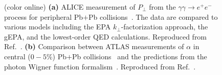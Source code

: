 \documentclass[12pt,epjc3]{svjour3}\sloppy
\begin{document}
\begin{figure}
    \caption{ (color online) \textbf{(a)} ALICE measurement of $P_\perp$ from the $\gamma\gamma \rightarrow e^+e^-$ process for peripheral Pb$+$Pb collisions~\cite{lehnerDielectronProductionLow2019a}. The data are compared to various models including the EPA $k_\perp$-factorization approach, the gEPA, and the lowest-order QED calculations. Reproduced from Ref.~\cite{lehnerDielectronProductionLow2019a}.
    \textbf{(b)} Comparison between ATLAS measurements of $\alpha$ in central ($0-5\%$) Pb$+$Pb collisions~\cite{atlascollaborationObservationCentralityDependentAcoplanarity2018a} and the predictions from the photon Wigner function formalism~\cite{klusek-gawendaCentralityDependenceDilepton2021}. Reproduced from Ref.~\cite{klusek-gawendaCentralityDependenceDilepton2021}.
    }
    \label{fig:exp_hadronic}
\end{figure}
\end{document}
